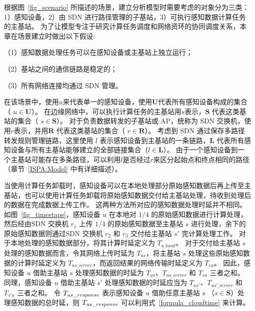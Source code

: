 根据图~\ref{fig_scenario} 所描述的场景，建立分析模型时需要考虑的对象分为三类：
1）感知设备，2）由 SDN 进行路径管理的子基站，3）可执行感知数据计算任务的主基站。
为了让模型专注于研究计算任务调度和网络资环的协同调度关系，本章在场景建立时做出以下假设: 

（1）感知数据处理任务可以在感知设备或主基站上独立运行；

（2）基站之间的通信链路是稳定的；

（3）所有网络连接均通过 SDN 管理。



在该场景中，使用$u$来代表单一的感知设备，使用$\boldsymbol{U}$代表所有感知设备构成的集合（ $ u \in \boldsymbol{U} $）。
在边缘网络中，可以执行计算任务的主基站用$s$表示，$\boldsymbol{S}$ 代表这类基站的集合（ $ s \in \boldsymbol{S} $）。
对于负责数据转发的子基站或 AP，统称为 SDN 交换机，使用$r$表示，并用$\boldsymbol{R}$ 代表这类基站的集合（ $ r \in \boldsymbol{R} $）。
考虑到 SDN 通过保存多路径转发规则管理链路，这里使用 $l$ 表示感知设备到主基站的一条链路，$ \boldsymbol{L}$ 代表所有感知设备与所有主基站能够建立的全部链接集合（$l \in \boldsymbol{L} $）。
由于一个感知设备到一个主基站可能存在多条路径，可以利用$l$是否经过$r$来区分起始点和终点相同的路径（章节~\ref{ISPA:Model} 中有详细描述）。

当使用计算任务卸载时，感知设备可以在本地处理部分原始感知数据后再上传至主基站，也可以使用计算任务卸载将原始感知数据交付给主基站处理，待收到处理后的数据在完成数据上传工作。
这两种方法所对应的感知数据处理时延并不相同。
如图~\ref{fig_timestaps}，感知设备 $u$ 在本地对 $1/4$ 的原始感知数据进行计算处理，
然后经由SDN 交换机 $r_1$ 上传 $1/4$ 的原始感知数据至主基站 $s$ 进行处理，余下的原始感知数据则通过SDN 交换机 $r_2$ 和 $r_3$ 交付给主基站 $s'$ 完计算处理工作。
对于本地处理的感知数据部分，将其计算时延定义为 $T_{u\_local}$。
对于交付给主基站 $s$ 处理的感知数据而言，令其网络上传时延为 $T_{us}$，将主基站 $s$ 处理这些原始感知数据的计算时延定义为 $T_{us\_server}$，而返回结果的网络传输时延定义为 $T_{su}$。
因此，感知设备 $u$ 借助主基站 $s$ 处理感知数据的时延为 $T_{us}$、$T_{us\_server}$ 和 $T_{su}$ 三者之和。
同理，感知设备 $u$ 借助主基站 $s'$ 处理感知数据的时延应当为 $T_{us'}$、$T_{us'\_server}$ 和 $T_{s'u}$ 三者之和。
令 ${T}_{us\_response}$ 表示感知设备 $u$ 借助任意主基站 $s$ （$s \in \boldsymbol{S}$）处理感知数据的总时延，则 ${T}_{us\_response}$ 可以利用式~\ref{formula_cloudtime} 来计算。

